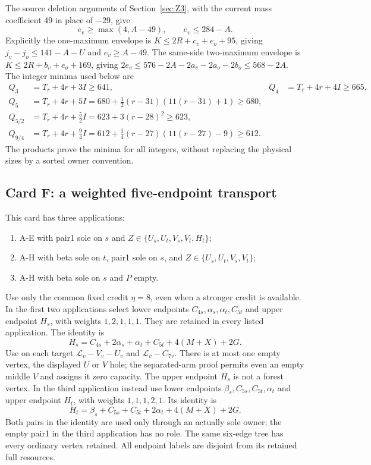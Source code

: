 \documentclass[11pt,letterpaper]{article}
\theoremstyle{definition}\newtheorem{definition}[theorem]{Definition}
\begin{document}
The source deletion arguments of Section~\ref{sec:Z3}, with the current mass coefficient 49 in place of $-29$, give
\begin{equation}\label{eq:z4-side}
 e_v\ge\max(4,A-49),\qquad e_v\le284-A.
\end{equation}
Explicitly the one-maximum envelope is $K\le2R+c_v+e_o+95$, giving $j_v-j_o\le141-A-U$ and $e_v\ge A-49$. The same-side two-maximum envelope is $K\le2R+b_v+e_o+169$, giving $2e_v\le576-2A-2a_v-2a_o-2b_o\le568-2A$.
The integer minima used below are
\begin{align*}
 Q_3&=T_r+4r+3I\ge641,& Q_4&=T_r+4r+4I\ge665,\\
 Q_5&=T_r+4r+5I=680+\tfrac12(r-31)(11(r-31)+1)\ge680,\\
 Q_{5/2}&=T_r+4r+\tfrac52I=623+3(r-28)^2\ge623,\\
 Q_{9/4}&=T_r+4r+\tfrac94I=612+\tfrac14(r-27)(11(r-27)-9)\ge612.
\end{align*}
The products prove the minima for all integers, without replacing the physical sizes by a sorted owner convention.


\subsection{Card F: a weighted five-endpoint transport}\label{sec:z4-cardF}
This card has three applications:
\begin{enumerate}
\item A-E with pair1 sole on $s$ and $Z\in\{U_s,U_t,V_s,V_t,H_t\}$;
\item A-H with beta sole on $t$, pair1 sole on $s$, and $Z\in\{U_s,U_t,V_s,V_t\}$;
\item A-H with beta sole on $s$ and $P$ empty.
\end{enumerate}
Use only the common fixed credit $\eta=8$, even when a stronger credit is available.
In the first two applications select lower endpoints $C_{4s},\alpha_s,\alpha_t,C_{5t}$ and upper endpoint $H_s$, with weights $1,2,1,1,1$. They are retained in every listed application. The identity is
\[
 H_s=C_{4s}+2\alpha_s+\alpha_t+C_{5t}+4(M+X)+2G.
\]
Use on each target $\mathcal L_v-V_v-U_v$ and $\mathcal L_v-C_{7v}$. There is at most one empty vertex, the displayed $U$ or $V$ hole; the separated-arm proof permits even an empty middle $V$ and assigns it zero capacity. The upper endpoint $H_s$ is not a forest vertex.
In the third application instead use lower endpoints $\beta_s,C_{5s},C_{5t},\alpha_t$ and upper endpoint $H_t$, with weights $1,1,1,2,1$. Its identity is
\[
 H_t=\beta_s+C_{5s}+C_{5t}+2\alpha_t+4(M+X)+2G.
\]
Both pairs in the identity are used only through an actually sole owner; the empty pair1 in the third application has no role. The same six-edge tree has every ordinary vertex retained. All endpoint labels are disjoint from its retained full resources.
\end{document}
